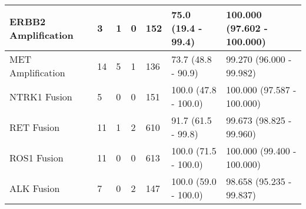 \begin{tabular}{|l|l|l|l|l|l|l|}
ERBB2 Amplification         &    3 &    1 &    0 &    152 &    75.0 (19.4 - 99.4) &  100.000 (97.602 - 100.000) \\ \hline
MET Amplification           &   14 &    5 &    1 &    136 &    73.7 (48.8 - 90.9) &    99.270 (96.000 - 99.982) \\ \hline
NTRK1 Fusion                &    5 &    0 &    0 &    151 &  100.0 (47.8 - 100.0) &  100.000 (97.587 - 100.000) \\ \hline
RET Fusion                  &   11 &    1 &    2 &    610 &    91.7 (61.5 - 99.8) &    99.673 (98.825 - 99.960) \\ \hline
ROS1 Fusion                 &   11 &    0 &    0 &    613 &  100.0 (71.5 - 100.0) &  100.000 (99.400 - 100.000) \\ \hline
ALK Fusion                  &    7 &    0 &    2 &    147 &  100.0 (59.0 - 100.0) &    98.658 (95.235 - 99.837) \\ \hline
\end{tabular}